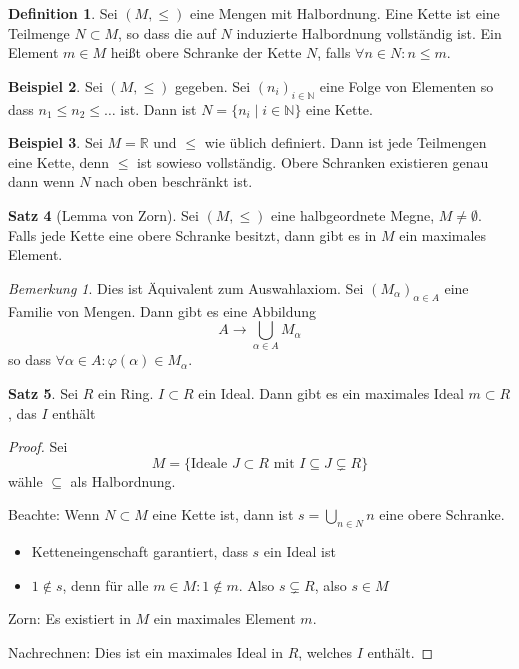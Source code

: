 \documentclass[12pt,parskip=full]{scrartcl}
\newcommand{\setN}{\mathbb{N}}
\newcommand{\setR}{\mathbb{R}}
\theoremstyle{definition}
\newtheorem{theorem}{Satz}[section]
\newtheorem{definition}[theorem]{Definition}
\newtheorem{example}[theorem]{Beispiel}
\theoremstyle{remark}
\newtheorem*{remark}{Bemerkung}
\begin{document}
	\begin{definition}
		Sei $(M, \leq)$ eine Mengen mit Halbordnung. Eine Kette ist eine Teilmenge $N \subset M$, so dass die auf $N$ induzierte Halbordnung vollständig ist. Ein Element $m \in M$ heißt obere Schranke der Kette $N$, falls $\forall n \in N: n \leq m$.
	\end{definition}

	\begin{example}
		Sei $(M, \leq)$ gegeben. Sei $(n_i)_{i \in \setN}$ eine Folge von Elementen so dass $n_1 \leq n_2 \leq \dots$ ist. Dann ist $N = \{ n_i \mid i \in \setN \}$ eine Kette.
	\end{example}

	\begin{example}
		Sei $M = \setR$ und $\leq$ wie üblich definiert. Dann ist jede Teilmengen eine Kette, denn $\leq$ ist sowieso vollständig. Obere Schranken existieren genau dann wenn $N$ nach oben beschränkt ist.
	\end{example}

	\begin{theorem}[Lemma von Zorn]
		Sei $(M, \leq)$ eine halbgeordnete Megne, $M \neq \emptyset$. Falls jede Kette eine obere Schranke besitzt, dann gibt es in $M$ ein maximales Element.
	\end{theorem}

	\begin{remark}
		Dies ist Äquivalent zum Auswahlaxiom. Sei $(M_\alpha)_{\alpha \in A}$ eine Familie von Mengen. Dann gibt es eine Abbildung
		\begin{equation*}
			A \to \bigcup_{\alpha \in A} M_\alpha
		\end{equation*}
		so dass $\forall \alpha \in A: \varphi(\alpha) \in M_\alpha$.
	\end{remark}

	\begin{theorem}
		Sei $R$ ein Ring. $I \subset R$ ein Ideal. Dann gibt es ein maximales Ideal $m \subset R$, das $I$ enthält
	\end{theorem}
	
	\begin{proof}
		Sei
		\begin{equation*}
			M = \{ \text{Ideale $J \subset R$ mit $I \subseteq J \subsetneq R$} \}
		\end{equation*}
		wähle $\subseteq$ als Halbordnung.
		
		Beachte: Wenn $N \subset M$ eine Kette ist, dann ist $s = \bigcup_{n \in N} n$ eine obere Schranke.
		\begin{itemize}
			\item Ketteneingenschaft garantiert, dass $s$ ein Ideal ist
			\item $1 \notin s$, denn für alle $m \in M: 1 \notin m$. Also $s \subsetneq R$, also $s \in M$
		\end{itemize}
		Zorn: Es existiert in $M$ ein maximales Element $m$.
		
		Nachrechnen: Dies ist ein maximales Ideal in $R$, welches $I$ enthält.
	\end{proof}
	
\end{document}
